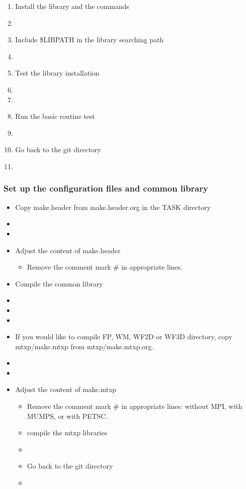 \documentclass[11pt]{article}
\begin{document}
\begin{enumerate}
\item
Install the library and the commands
\item[\qquad]
\item
Include \$LIBPATH in the library searching path
\item[\qquad]
\item
Test the library installation
\item[\qquad]
\item[\qquad]
\item
Run the basic routine test
\item[\qquad]
\item
Go back to the git directory
\item[\qquad]
\end{enumerate}

\subsubsection{Set up the configuration files and common library}

\begin{itemize}
\item
Copy make.header from make.header.org in the TASK directory 
\item[\qquad]
\item[\qquad]
\item
Adjust the content of make.header
\begin{itemize}
\item
Remove the comment mark \# in appropriate lines.
\end{itemize}
\item
Compile the common library
\item[\qquad]
\item[\qquad]
\item[\qquad]

\item
If you would like to compile FP, WM, WF2D or WF3D directory, copy
mtxp/make.mtxp from mtxp/make.mtxp.org.
\item[\qquad]
\item[\qquad]
\item
Adjust the content of make.mtxp
\begin{itemize}
\item
Remove the comment mark \# in appropriate lines: without MPI, with
MUMPS, or with PETSC.
\item
compile the mtxp libraries
\item[\qquad]
\item
Go back to the git directory
\item[\qquad]
\end{itemize}
\end{itemize}
\end{document}
